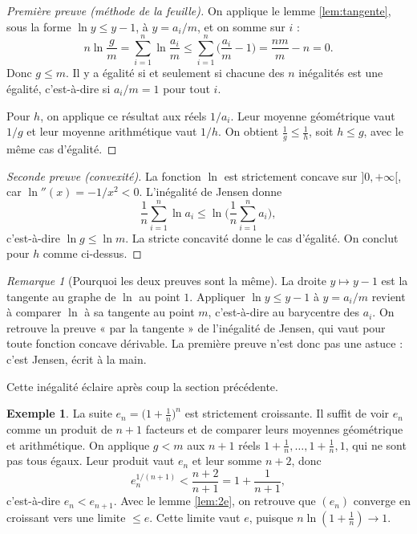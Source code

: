\documentclass[11pt,a4paper]{article}
\theoremstyle{plain}
\theoremstyle{definition}
\newtheorem{exemple}[theoreme]{Exemple}
\theoremstyle{remark}
\newtheorem{remarque}[theoreme]{Remarque}
\begin{document}
\begin{proof}[Première preuve (méthode de la feuille)]
On applique le lemme \ref{lem:tangente}, sous la forme $\ln y\leq y-1$, à $y=a_i/m$, et on somme sur $i$ :
\[
  n\ln\frac gm=\sum_{i=1}^n\ln\frac{a_i}m\leq\sum_{i=1}^n\Big(\frac{a_i}m-1\Big)=\frac{nm}m-n=0 .
\]
Donc $g\leq m$. Il y a égalité si et seulement si chacune des $n$ inégalités est une égalité, c'est-à-dire si $a_i/m=1$ pour tout $i$.

Pour $h$, on applique ce résultat aux réels $1/a_i$. Leur moyenne géométrique vaut $1/g$ et leur moyenne arithmétique vaut $1/h$. On obtient $\frac1g\leq\frac1h$, soit $h\leq g$, avec le même cas d'égalité.
\end{proof}

\begin{proof}[Seconde preuve (convexité)]
La fonction $\ln$ est strictement concave sur $]0,+\infty[$, car $\ln''(x)=-1/x^2<0$. L'inégalité de Jensen donne
\[
  \frac1n\sum_{i=1}^n\ln a_i\leq\ln\Big(\frac1n\sum_{i=1}^na_i\Big),
\]
c'est-à-dire $\ln g\leq\ln m$. La stricte concavité donne le cas d'égalité. On conclut pour $h$ comme ci-dessus.
\end{proof}

\begin{remarque}[Pourquoi les deux preuves sont la même]
La droite $y\mapsto y-1$ est la tangente au graphe de $\ln$ au point $1$. Appliquer $\ln y\leq y-1$ à $y=a_i/m$ revient à comparer $\ln$ à sa tangente au point $m$, c'est-à-dire au barycentre des $a_i$. On retrouve la preuve « par la tangente » de l'inégalité de Jensen, qui vaut pour toute fonction concave dérivable. La première preuve n'est donc pas une astuce : c'est Jensen, écrit à la main.
\end{remarque}

Cette inégalité éclaire après coup la section précédente.

\begin{exemple}\label{ex:croissance-e}
La suite $e_n=\big(1+\frac1n\big)^n$ est strictement croissante. Il suffit de voir $e_n$ comme un produit de $n+1$ facteurs et de comparer leurs moyennes géométrique et arithmétique. On applique $g<m$ aux $n+1$ réels $1+\frac1n,\dots,1+\frac1n,1$, qui ne sont pas tous égaux. Leur produit vaut $e_n$ et leur somme $n+2$, donc
\[
  e_n^{1/(n+1)}<\frac{n+2}{n+1}=1+\frac1{n+1},
\]
c'est-à-dire $e_n<e_{n+1}$. Avec le lemme \ref{lem:2e}, on retrouve que $(e_n)$ converge en croissant vers une limite $\leq e$. Cette limite vaut $e$, puisque $n\ln(1+\frac1n)\to1$.
\end{exemple}
\end{document}
